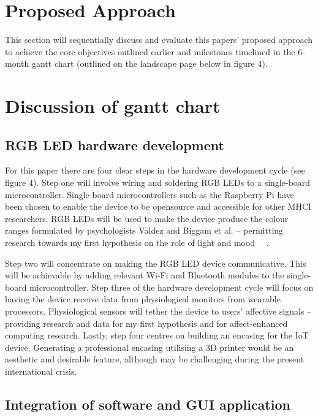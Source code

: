 \documentclass{sigchi}
\begin{document}
\section{Proposed Approach}

This section will sequentially discuss and evaluate this papers’ proposed approach to achieve the core objectives outlined earlier and milestones timelined in the 6-month gantt chart (outlined on the landscape page below in figure 4).

\section{Discussion of gantt chart}
\subsection{RGB LED hardware development}

For this paper there are four clear steps in the hardware development cycle (see figure 4). Step one will involve wiring and soldering RGB LEDs to a single-board microcontroller. Single-board microcontrollers such as the Raspberry Pi have been chosen to enable the device to be opensource and accessible for other MHCI researchers. RGB LEDs will be used to make the device produce the colour ranges formulated by psychologists Valdez and Biggam et al. – permitting research towards my first hypothesis on the role of light and mood ~\cite{biggam2006progress}~\cite{valdez1994effects}.

Step two will concentrate on making the RGB LED device communicative. This will be achievable by adding relevant Wi-Fi and Bluetooth modules to the single-board microcontroller. Step three of the hardware development cycle will focus on having the device receive data from physiological monitors from wearable processors. Physiological sensors will tether the device to users’ affective signals – providing research and data for my first hypothesis and for affect-enhanced computing research. Lastly, step four centres on building an encasing for the IoT device. Generating a professional encasing utilising a 3D printer would be an aesthetic and desirable feature, although may be challenging during the present international crisis.

\subsection{Integration of software and GUI application}
\end{document}
